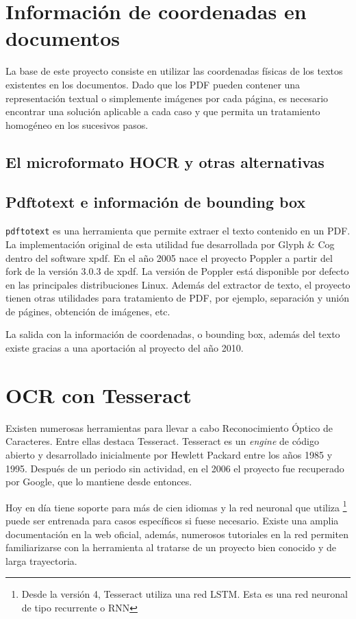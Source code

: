 \section{Información de coordenadas en documentos}

La base de este proyecto consiste en utilizar las coordenadas físicas de los textos existentes en los documentos. Dado que los PDF pueden contener una representación textual o simplemente imágenes por cada página, es necesario encontrar una solución aplicable a cada caso y que permita un tratamiento homogéneo en los sucesivos pasos.

\subsection{El microformato HOCR y otras alternativas}



\subsection{Pdftotext e información de bounding box}

\verb|pdftotext| es una herramienta que permite extraer el texto contenido en un PDF. La implementación original de esta utilidad fue desarrollada por Glyph \& Cog dentro del software xpdf. En el año 2005 nace el proyecto Poppler a partir del fork de la versión 3.0.3 de xpdf. La versión de Poppler está disponible por defecto en las principales distribuciones Linux. Además del extractor de texto, el proyecto tienen otras utilidades para tratamiento de PDF, por ejemplo, separación y unión de págines, obtención de imágenes, etc.

La salida con la información de coordenadas, o bounding box, además del texto existe gracias a una aportación al proyecto del año 2010. 

\section{OCR con Tesseract}

Existen numerosas herramientas para llevar a cabo Reconocimiento Óptico de Caracteres. Entre ellas destaca Tesseract. Tesseract es un \emph{engine} de código abierto y desarrollado inicialmente por Hewlett Packard entre los años 1985 y 1995. Después de un periodo sin actividad, en el 2006 el proyecto fue recuperado por Google, que lo mantiene desde entonces.

Hoy en día tiene soporte para más de cien idiomas y la red neuronal que utiliza \footnote{Desde la versión 4, Tesseract utiliza una red LSTM. Esta es una red neuronal de tipo recurrente o RNN} puede ser entrenada para casos específicos si fuese necesario. Existe una amplia documentación en la web oficial, además, numerosos tutoriales en la red permiten familiarizarse con la herramienta al tratarse de un proyecto bien conocido y de larga trayectoria.

